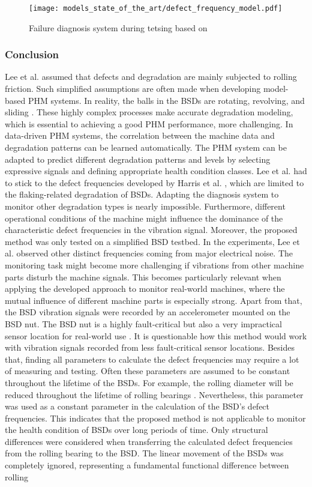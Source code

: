 \begin{figure}[H]
  \centering
  \texttt{[image: models\_state\_of\_the\_art/defect\_frequency\_model.pdf]}
  \caption{Failure diagnosis system during tetsing based on \cite{Lee2015}}
  \label{fig:defect_frequency_model}
\end{figure}

\subsubsection{Conclusion}
Lee et al. \cite{Lee2015} assumed that defects and degradation are mainly subjected to rolling friction. Such simplified assumptions are often made when developing model-based PHM systems. In reality, the balls in the BSDs are rotating, revolving, and sliding \cite{Lee2015}. These highly complex processes make accurate degradation modeling, which is essential to achieving a good PHM performance, more challenging. In data-driven PHM systems, the correlation between the machine data and degradation patterns can be learned automatically. The PHM system can be adapted to predict different degradation patterns and levels by selecting expressive signals and defining appropriate health condition classes. Lee et al. \cite{Lee2015} had to stick to the defect frequencies developed by Harris et al. \cite{Harris1996}, which are limited to the flaking-related degradation of BSDs. Adapting the diagnosis system to monitor other degradation types is nearly impossible. Furthermore, different operational conditions of the machine might influence the dominance of the characteristic defect frequencies in the vibration signal. Moreover, the proposed method was only tested on a simplified BSD testbed. In the experiments, Lee et al. \cite{Lee2015} observed other distinct frequencies coming from major electrical noise. The monitoring task might become more challenging if vibrations from other machine parts disturb the machine signals. This becomes particularly relevant when applying the developed approach to monitor real-world machines, where the mutual influence of different machine parts is especially strong. Apart from that, the BSD vibration signals were recorded by an accelerometer mounted on the BSD nut. The BSD nut is a highly fault-critical but also a very impractical sensor location for real-world use \cite{Pandhare2021}. It is questionable how this method would work with vibration signals recorded from less fault-critical sensor locations. Besides that, finding all parameters to calculate the defect frequencies may require a lot of measuring and testing. Often these parameters are assumed to be constant throughout the lifetime of the BSDs. For example, the rolling diameter will be reduced throughout the lifetime of rolling bearings \cite{Denkena2021}. Nevertheless, this parameter was used as a constant parameter in the calculation of the BSD's defect frequencies. This indicates that the proposed method is not applicable to monitor the health condition of BSDs over long periods of time. Only structural differences were considered when transferring the calculated defect frequencies from the rolling bearing to the BSD. The linear movement of the BSDs was completely ignored, representing a fundamental functional difference between rolling 